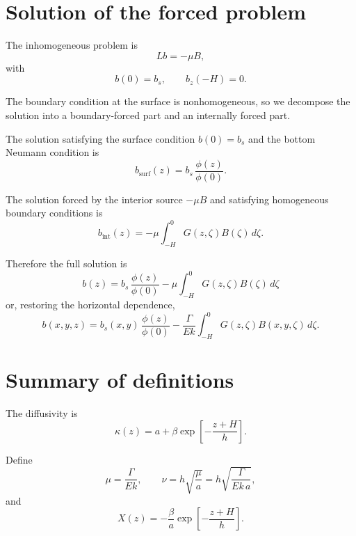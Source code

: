 \documentclass[10pt]{amsart}
\begin{document}
\section{Solution of the forced problem}

The inhomogeneous problem is
\begin{equation}
L b = -\mu B,
\end{equation}
with
\[
b(0)=b_s,
\qquad
b_z(-H)=0.
\]

The boundary condition at the surface is nonhomogeneous, so we decompose the solution into a boundary-forced part and an internally forced part.

The solution satisfying the surface condition \(b(0)=b_s\) and the bottom Neumann condition is
\begin{equation}
b_{\mathrm{surf}}(z)
=
b_s\,\frac{\phi(z)}{\phi(0)}.
\label{eq:surface_solution}
\end{equation}

The solution forced by the interior source \(-\mu B\) and satisfying homogeneous boundary conditions is
\begin{equation}
b_{\mathrm{int}}(z)
=
-\mu
\int_{-H}^{0}
G(z,\zeta)B(\zeta)\,d\zeta.
\label{eq:interior_solution}
\end{equation}

Therefore the full solution is
\begin{equation}
\boxed{
b(z)
=
b_s\,\frac{\phi(z)}{\phi(0)}
-
\mu
\int_{-H}^{0}
G(z,\zeta)B(\zeta)\,d\zeta
}
\label{eq:solution_1d}
\end{equation}
or, restoring the horizontal dependence,
\begin{equation}
\boxed{
b(x,y,z)
=
b_s(x,y)\,\frac{\phi(z)}{\phi(0)}
-
\frac{\Gamma}{E k}
\int_{-H}^{0}
G(z,\zeta)B(x,y,\zeta)\,d\zeta.
}
\label{eq:solution_full}
\end{equation}

\section{Summary of definitions}

The diffusivity is
\begin{equation}
\kappa(z)
=
a+\beta \exp\!\left[-\frac{z+H}{h}\right].
\end{equation}

Define
\begin{equation}
\mu = \frac{\Gamma}{E k},
\qquad
\nu
=
h\sqrt{\frac{\mu}{a}}
=
h\sqrt{\frac{\Gamma}{E k\,a}},
\end{equation}
and
\begin{equation}
X(z)
=
-\frac{\beta}{a}\exp\!\left[-\frac{z+H}{h}\right].
\end{equation}
\end{document}
